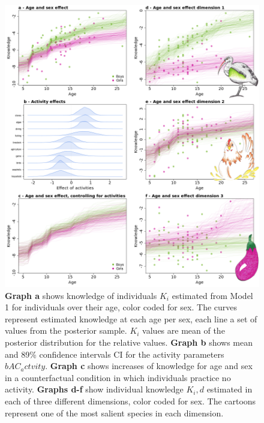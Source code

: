 \begin{figure}
\includegraphics[width=12cm]{4_Outputs/plots/exaptychpics.png}
\caption{\textbf{Graph a} shows knowledge of individuals $K_i$ estimated from Model 1 for individuals over their age, color coded for sex. The curves represent estimated knowledge at each age per sex, each line a set of values from the posterior sample. $K_i$ values are mean of the posterior distribution for the relative values. \textbf{Graph b} shows mean and 89\% confidence intervals CI for the activity parameters $bAC_actvity$. \textbf{Graph c} shows increases of knowledge for age and sex in a counterfactual condition in which individuals practice no activity. \textbf{Graphs d-f} show individual knowledge $K_i,d$ estimated in each of three different dimensions, color coded for sex. The cartoons represent one of the most salient species in each dimension.}
\label{fig:quadriptych}
\end{figure}







